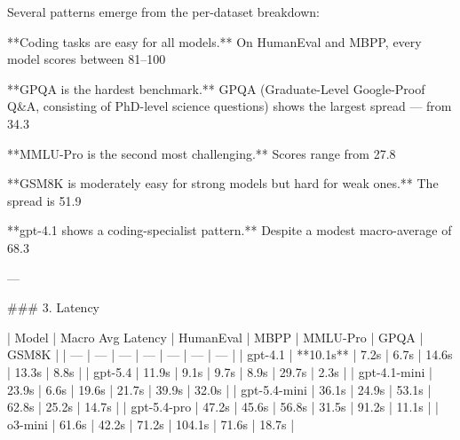 Several patterns emerge from the per-dataset breakdown:

**Coding tasks are easy for all models.** On HumanEval and MBPP, every model scores between 81–100%

**GPQA is the hardest benchmark.** GPQA (Graduate-Level Google-Proof Q&A, consisting of PhD-level science questions) shows the largest spread — from 34.3%

**MMLU-Pro is the second most challenging.** Scores range from 27.8%

**GSM8K is moderately easy for strong models but hard for weak ones.** The spread is 51.9%

**gpt-4.1 shows a coding-specialist pattern.** Despite a modest macro-average of 68.3%

---

### 3. Latency

| Model | Macro Avg Latency | HumanEval | MBPP | MMLU-Pro | GPQA | GSM8K |
| --- | --- | --- | --- | --- | --- | --- |
| gpt-4.1 | **10.1s** | 7.2s | 6.7s | 14.6s | 13.3s | 8.8s |
| gpt-5.4 | 11.9s | 9.1s | 9.7s | 8.9s | 29.7s | 2.3s |
| gpt-4.1-mini | 23.9s | 6.6s | 19.6s | 21.7s | 39.9s | 32.0s |
| gpt-5.4-mini | 36.1s | 24.9s | 53.1s | 62.8s | 25.2s | 14.7s |
| gpt-5.4-pro | 47.2s | 45.6s | 56.8s | 31.5s | 91.2s | 11.1s |
| o3-mini | 61.6s | 42.2s | 71.2s | 104.1s | 71.6s | 18.7s |

